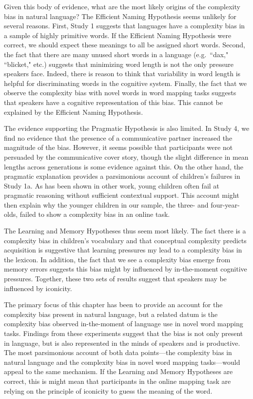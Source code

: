 Given this body of evidence, what are the most likely origins of the complexity bias in natural language? The Efficient Naming Hypothesis seems unlikely for several reasons. First, Study 1 suggests that languages have a complexity bias in a  sample of highly primitive words. If the Efficient Naming Hypothesis were correct, we should expect these meanings to all be assigned short words. Second, the fact that there are many unused short words in a language (e.g.\ ``dax," ``blicket," etc.) suggests that minimizing word length is not the only pressure speakers face. Indeed, there is reason to think that variability in word length is helpful for discriminating words in the cognitive system. Finally, the fact that we observe the complexity bias with novel words in word mapping tasks suggests that speakers have a cognitive representation of this bias. This cannot be explained by the Efficient Naming Hypothesis.

The evidence supporting the Pragmatic Hypothesis is also limited. In Study 4, we find no evidence that the presence of a communicative partner increased the magnitude of the bias. However, it seems possible that participants were not persuaded by the communicative cover story, though the slight difference in mean lengths across generations is some evidence against this. On the other hand, the pragmatic explanation provides a parsimonious account of children's failures in Study 1a. As has been shown in other work, young children often fail at pragmatic reasoning without sufficient contextual support. This account might then explain why the younger children in our sample, the three- and four-year-olds, failed to show a complexity bias in an online task. 

The Learning and Memory Hypotheses thus seem most likely. The fact there is a complexity bias in children's vocabulary and that conceptual complexity predicts acquisition is suggestive that learning pressures my lead to a complexity bias in the lexicon. In addition, the fact that we see a complexity bias emerge from memory errors suggests this bias might by influenced by in-the-moment cognitive pressures. Together, these two sets of results suggest that speakers may be influenced by iconicity.

The primary focus of this chapter has been to provide an account for the complexity bias present in natural language, but a related datum is the complexity bias observed in-the-moment of language use in novel word mapping tasks. Findings from these experiments suggest that the bias is not only present in language, but is also represented in the minds of speakers and is productive. The most parsimonious account of both data points---the complexity bias in natural language and the complexity bias in novel word mapping tasks---would appeal to the same mechanism. If the Learning and Memory Hypotheses are correct, this is might mean that participants in the online mapping task are relying on the principle of iconicity to guess the meaning of the word. 

